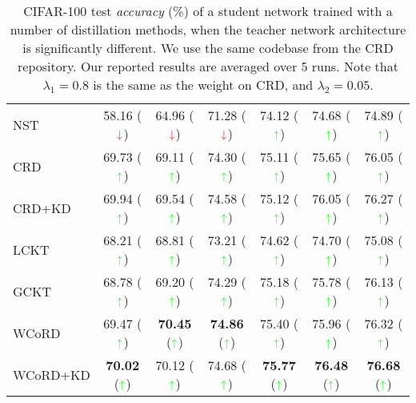 \documentclass[final]{cvpr}
\theoremstyle{definition}
\newcommand*{\mathcolor}{}
\def\mathcolor#1#{\mathcoloraux{#1}}
\newcommand*{\mathcoloraux}[3]{\protect\leavevmode
  \begingroup
    \color#1{#2}#3\endgroup
}
\begin{document}
\begin{table*}[t!]
\begin{center}
\begin{tabular}{lcccccc}
NST  & 58.16 ($\mathcolor{red}{\downarrow}$)& 64.96 ($\mathcolor{red}{\downarrow}$)& 71.28 ($\mathcolor{red}{\downarrow}$)& 74.12 ($\mathcolor{green}{\uparrow}$)& 74.68 ($\mathcolor{green}{\uparrow}$)& 74.89 ($\mathcolor{green}{\uparrow}$)\\
CRD & {69.73} ($\mathcolor{green}{\uparrow}$)& {69.11} ($\mathcolor{green}{\uparrow}$)& {74.30} ($\mathcolor{green}{\uparrow}$)& {75.11} ($\mathcolor{green}{\uparrow}$)& {75.65} ($\mathcolor{green}{\uparrow}$)& {76.05} ($\mathcolor{green}{\uparrow}$)\\
CRD+KD & 69.94 ($\mathcolor{green}{\uparrow}$)& 69.54 ($\mathcolor{green}{\uparrow}$)& 74.58 ($\mathcolor{green}{\uparrow}$)& 75.12 ($\mathcolor{green}{\uparrow}$)& 76.05 ($\mathcolor{green}{\uparrow}$)& 76.27 ($\mathcolor{green}{\uparrow}$)\\
\midrule


LCKT & 68.21 ($\mathcolor{green}{\uparrow}$)& 68.81 ($\mathcolor{green}{\uparrow}$)& 73.21 ($\mathcolor{green}{\uparrow}$)& 74.62 ($\mathcolor{green}{\uparrow}$)& 74.70 ($\mathcolor{green}{\uparrow}$)& 75.08  ($\mathcolor{green}{\uparrow}$)\\

GCKT & 68.78 ($\mathcolor{green}{\uparrow}$)& 69.20 ($\mathcolor{green}{\uparrow}$)& 74.29 ($\mathcolor{green}{\uparrow}$)& 75.18 ($\mathcolor{green}{\uparrow}$)& 75.78 ($\mathcolor{green}{\uparrow}$)& 76.13  ($\mathcolor{green}{\uparrow}$)\\

WCoRD & 69.47 ($\mathcolor{green}{\uparrow}$)& \textbf{70.45} ($\mathcolor{green}{\uparrow}$)& \textbf{74.86} ($\mathcolor{green}{\uparrow}$)& 75.40 ($\mathcolor{green}{\uparrow}$)& 75.96 ($\mathcolor{green}{\uparrow}$)& 76.32 ($\mathcolor{green}{\uparrow}$)\\
                                                      
WCoRD+KD & \textbf{70.02} ($\mathcolor{green}{\uparrow}$)& {70.12} ($\mathcolor{green}{\uparrow}$)& {74.68} ($\mathcolor{green}{\uparrow}$)& \textbf{75.77} ($\mathcolor{green}{\uparrow}$)& \textbf{76.48} ($\mathcolor{green}{\uparrow}$)& \textbf{76.68} ($\mathcolor{green}{\uparrow}$)\\
\bottomrule
\end{tabular}
\caption{
\small{
CIFAR-100 test \emph{accuracy} (\%) of a student network trained with a number of distillation methods, when the teacher network architecture is significantly different. We use the same codebase from the CRD repository. Our reported results are averaged over 5 runs. Note that $\lambda_1=0.8$ is the same as the weight on CRD, and $\lambda_2=0.05$.
}}
\label{tb:cifar100_diff}
\end{center}
\vspace{-4mm}
\end{table*} 
\end{document}
